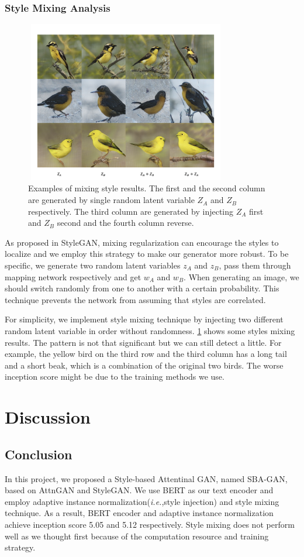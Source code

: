 \documentclass{article}
\begin{document}
\subsubsection{Style Mixing Analysis}
\begin{figure}
\centering
\includegraphics[width=250pt, height=200pt]{report/fig4.png} 
\caption{Examples of mixing style results. The first and the second column are generated by single random latent variable $Z_A$ and $Z_B$ respectively. The third column are generated by injecting $Z_A$ first and $Z_B$ second and the fourth column reverse.}
\label{fig4}
\end{figure}
As proposed in StyleGAN\cite{stylegan}, mixing regularization can encourage the styles to localize and we employ this strategy to make our generator more robust. To be specific, we generate two random latent variables $z_A$ and $z_B$, pass them through mapping network respectively and get $w_A$ and $w_B$. When generating an image, we should switch randomly from one to another with a certain probability. This technique prevents the network from assuming that styles are correlated.

For simplicity, we implement style mixing technique by injecting two different random latent variable in order without randomness. \ref{fig4} shows some styles mixing results. The pattern is not that significant but we can still detect a little. For example, the yellow bird on the third row and the third column has a long tail and a short beak, which is a combination of the original two birds. The worse inception score might be due to the training methods we use.


\section{Discussion}
\subsection{Conclusion}
In this project, we proposed a Style-based Attentinal GAN, named SBA-GAN, based on AttnGAN\cite{attngan} and StyleGAN\cite{stylegan}. We use BERT as our text encoder and employ adaptive instance normalization(\textit{i.e.},style injection) and style mixing technique. As a result, BERT encoder and adaptive instance normalization achieve inception score 5.05 and 5.12 respectively. Style mixing does not perform well as we thought first because of the computation resource and training strategy.
\end{document}
